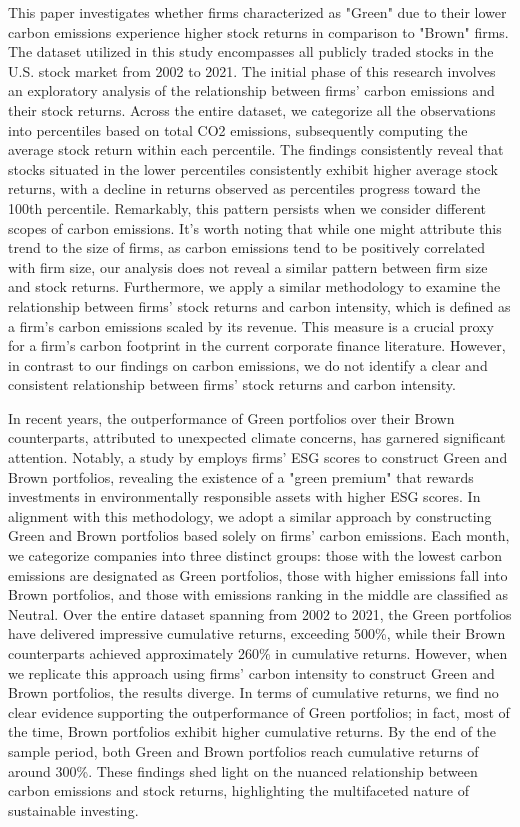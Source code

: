 \documentclass[12pt]{article}
\begin{document}
This paper investigates whether firms characterized as "Green" due to their lower carbon emissions experience higher stock returns in comparison to "Brown" firms. The dataset utilized in this study encompasses all publicly traded stocks in the U.S. stock market from 2002 to 2021. The initial phase of this research involves an exploratory analysis of the relationship between firms' carbon emissions and their stock returns. Across the entire dataset, we categorize all the observations into percentiles based on total CO2 emissions, subsequently computing the average stock return within each percentile. The findings consistently reveal that stocks situated in the lower percentiles consistently exhibit higher average stock returns, with a decline in returns observed as percentiles progress toward the 100th percentile. Remarkably, this pattern persists when we consider different scopes of carbon emissions. It's worth noting that while one might attribute this trend to the size of firms, as carbon emissions tend to be positively correlated with firm size, our analysis does not reveal a similar pattern between firm size and stock returns. Furthermore, we apply a similar methodology to examine the relationship between firms' stock returns and carbon intensity, which is defined as a firm's carbon emissions scaled by its revenue. This measure is a crucial proxy for a firm's carbon footprint in the current corporate finance literature. However, in contrast to our findings on carbon emissions, we do not identify a clear and consistent relationship between firms' stock returns and carbon intensity.

In recent years, the outperformance of Green portfolios over their Brown counterparts, attributed to unexpected climate concerns, has garnered significant attention. Notably, a study by \cite{pastor2022dissecting} employs firms' ESG scores to construct Green and Brown portfolios, revealing the existence of a "green premium" that rewards investments in environmentally responsible assets with higher ESG scores. In alignment with this methodology, we adopt a similar approach by constructing Green and Brown portfolios based solely on firms' carbon emissions. Each month, we categorize companies into three distinct groups: those with the lowest carbon emissions are designated as Green portfolios, those with higher emissions fall into Brown portfolios, and those with emissions ranking in the middle are classified as Neutral. Over the entire dataset spanning from 2002 to 2021, the Green portfolios have delivered impressive cumulative returns, exceeding 500\%, while their Brown counterparts achieved approximately 260\% in cumulative returns. However, when we replicate this approach using firms' carbon intensity to construct Green and Brown portfolios, the results diverge. In terms of cumulative returns, we find no clear evidence supporting the outperformance of Green portfolios; in fact, most of the time, Brown portfolios exhibit higher cumulative returns. By the end of the sample period, both Green and Brown portfolios reach cumulative returns of around 300\%. These findings shed light on the nuanced relationship between carbon emissions and stock returns, highlighting the multifaceted nature of sustainable investing.
\end{document}
